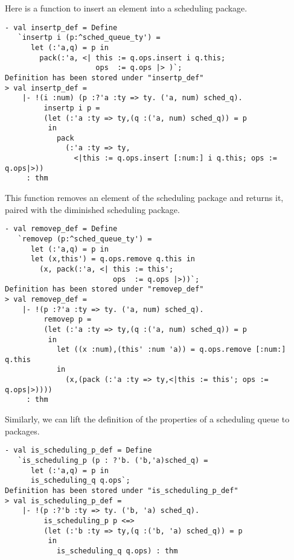 \noindent
Here is a function to insert an element into a scheduling package.
\begin{session}
\begin{verbatim}
- val insertp_def = Define
   `insertp i (p:^sched_queue_ty') =
      let (:'a,q) = p in
        pack(:'a, <| this := q.ops.insert i q.this;
                     ops  := q.ops |> )`;
Definition has been stored under "insertp_def"
> val insertp_def =
    |- !(i :num) (p :?'a :ty => ty. ('a, num) sched_q).
         insertp i p =
         (let (:'a :ty => ty,(q :('a, num) sched_q)) = p
          in
            pack
              (:'a :ty => ty,
                <|this := q.ops.insert [:num:] i q.this; ops := q.ops|>))
     : thm
\end{verbatim}
\end{session}

\noindent
This function removes an element of the scheduling package and returns it,
paired with the diminished scheduling package.
\begin{session}
\begin{verbatim}
- val removep_def = Define
   `removep (p:^sched_queue_ty') =
      let (:'a,q) = p in
      let (x,this') = q.ops.remove q.this in
        (x, pack(:'a, <| this := this';
                         ops  := q.ops |>))`;
Definition has been stored under "removep_def"
> val removep_def =
    |- !(p :?'a :ty => ty. ('a, num) sched_q).
         removep p =
         (let (:'a :ty => ty,(q :('a, num) sched_q)) = p
          in
            let ((x :num),(this' :num 'a)) = q.ops.remove [:num:] q.this
            in
              (x,(pack (:'a :ty => ty,<|this := this'; ops := q.ops|>))))
     : thm
\end{verbatim}
\end{session}

\noindent
Similarly, we can lift the definition of the properties
of a scheduling queue to packages.
\begin{session}
\begin{verbatim}
- val is_scheduling_p_def = Define
   `is_scheduling_p (p : ?'b. ('b,'a)sched_q) =
      let (:'a,q) = p in
      is_scheduling_q q.ops`;
Definition has been stored under "is_scheduling_p_def"
> val is_scheduling_p_def =
    |- !(p :?'b :ty => ty. ('b, 'a) sched_q).
         is_scheduling_p p <=>
         (let (:'b :ty => ty,(q :('b, 'a) sched_q)) = p
          in
            is_scheduling_q q.ops) : thm
\end{verbatim}
\end{session}

